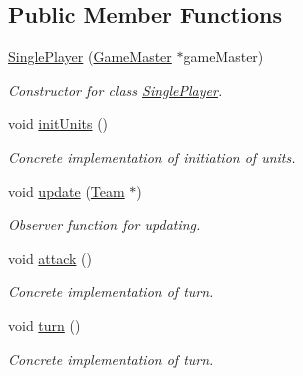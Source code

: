 \subsection*{Public Member Functions}
\begin{DoxyCompactItemize}
\item 
\hypertarget{class_single_player_a2ff989b1f86add4b65ea6a7e3cedc9bd}{}\hyperlink{class_single_player_a2ff989b1f86add4b65ea6a7e3cedc9bd}{Single\+Player} (\hyperlink{class_game_master}{Game\+Master} $\ast$game\+Master)\label{class_single_player_a2ff989b1f86add4b65ea6a7e3cedc9bd}

\begin{DoxyCompactList}\small\item\em Constructor for class \hyperlink{class_single_player}{Single\+Player}. \end{DoxyCompactList}\item 
\hypertarget{class_single_player_a9eb796c51268c841f432c826e1e48dfa}{}void \hyperlink{class_single_player_a9eb796c51268c841f432c826e1e48dfa}{init\+Units} ()\label{class_single_player_a9eb796c51268c841f432c826e1e48dfa}

\begin{DoxyCompactList}\small\item\em Concrete implementation of initiation of units. \end{DoxyCompactList}\item 
\hypertarget{class_single_player_a79c9e8bc490ba0b9b62ad12372eb126e}{}void \hyperlink{class_single_player_a79c9e8bc490ba0b9b62ad12372eb126e}{update} (\hyperlink{class_team}{Team} $\ast$)\label{class_single_player_a79c9e8bc490ba0b9b62ad12372eb126e}

\begin{DoxyCompactList}\small\item\em Observer function for updating. \end{DoxyCompactList}\item 
\hypertarget{class_single_player_a0dad5df66a1aadd006dd0f1339008cee}{}void \hyperlink{class_single_player_a0dad5df66a1aadd006dd0f1339008cee}{attack} ()\label{class_single_player_a0dad5df66a1aadd006dd0f1339008cee}

\begin{DoxyCompactList}\small\item\em Concrete implementation of turn. \end{DoxyCompactList}\item 
\hypertarget{class_single_player_a9692093f7703200a431a3010db74cf5f}{}void \hyperlink{class_single_player_a9692093f7703200a431a3010db74cf5f}{turn} ()\label{class_single_player_a9692093f7703200a431a3010db74cf5f}

\begin{DoxyCompactList}\small\item\em Concrete implementation of turn. \end{DoxyCompactList}\end{DoxyCompactItemize}
